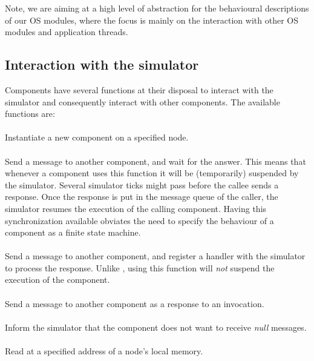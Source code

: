 Note, we are aiming at a high level of abstraction for the behavioural
descriptions of our OS modules, where the focus is mainly on the
interaction with other OS modules and application threads.


\subsection{Interaction with the simulator}

Components have several functions at their disposal to interact with
the simulator and consequently interact with other components.  The
available functions are:

\paragraph{}
Instantiate a new component on a specified node. 
\paragraph{}
Send a message to another component, and wait for the answer.  This
means that whenever a component uses this function it will be
(temporarily) suspended by the simulator.  Several simulator ticks
might pass before the callee sends a response.  Once the response is
put in the message queue of the caller, the simulator resumes the
execution of the calling component.  Having this synchronization
available obviates the need to specify the behaviour of a component as
a finite state machine.
\paragraph{}
Send a message to another component, and register a handler with the
simulator to process the response.  Unlike , using this
function will \emph{not} suspend the execution of the component.
\paragraph{}
Send a message to another component as a response to an invocation.
\paragraph{}
Inform the simulator that the component does not want to receive
\emph{null} messages.
\paragraph{}
Read at a specified address of a node's local memory.
